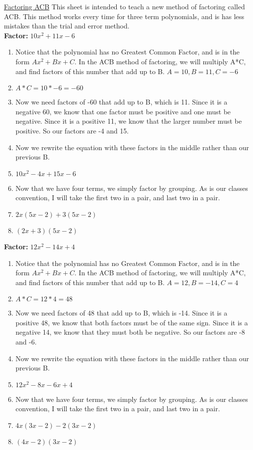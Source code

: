 \documentclass{article}
\begin{document}
\underline{Factoring ACB}
This sheet is intended to teach a new method of factoring called ACB. This method works every time for three term polynomials, and is has less mistakes than the trial and error method. \\
\textbf{Factor:} $10x^{2} + 11x -6$
\begin{enumerate}
  \item Notice that the polynomial has no Greatest Common Factor, and is in the form $Ax^{2} + Bx + C$. In the ACB method of factoring, we will multiply A*C, and find factors of this number that add up to B. $A=10, B=11, C=-6$
  \item[] $A*C = 10*-6 = -60$
  \item Now we need factors of -60 that add up to B, which is 11. Since it is a negative 60, we know that one factor must be positive and one must be negative. Since it is a positive 11, we know that the larger number must be positive. So our factors are -4 and 15.
  \item Now we rewrite the equation with these factors in the middle rather than our previous B.
  \item[] $10x^{2} -4x + 15x -6$
  \item Now that we have four terms, we simply factor by grouping. As is our classes convention, I will take the first two in a pair, and last two in a pair.
  \item[] $2x(5x-2) + 3(5x-2)$
  \item[] $(2x+3)(5x-2)$
\end{enumerate}
\textbf{Factor:} $12x^{2} - 14x + 4$
\begin{enumerate}
  \item Notice that the polynomial has no Greatest Common Factor, and is in the form $Ax^{2} + Bx + C$. In the ACB method of factoring, we will multiply A*C, and find factors of this number that add up to B. $A=12, B=-14, C=4$
  \item[] $A*C = 12*4 = 48$
  \item Now we need factors of 48 that add up to B, which is -14. Since it is a positive 48, we know that both factors must be of the same sign. Since it is a negative 14, we know that they must both be negative. So our factors are -8 and -6.
  \item Now we rewrite the equation with these factors in the middle rather than our previous B.
  \item[] $12x^{2} - 8x - 6x +4$
  \item Now that we have four terms, we simply factor by grouping. As is our classes convention, I will take the first two in a pair, and last two in a pair.
  \item[] $4x(3x-2) - 2(3x-2)$
  \item[] $(4x-2)(3x-2)$
\end{enumerate}
\end{document}
